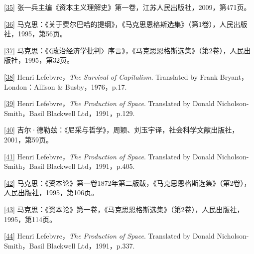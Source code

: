 \documentclass[UTF8, fontset = sourcesans, a4paper, oneside, zihao =
-4, scheme=chinese, no-math, space=true]{ctexbook}
\begin{document}
\protect\hypertarget{part0010_split_002.htmlux5cux23m35}{}{}\protect\hyperlink{part0010_split_002.htmlux5cux23w35}{{[}35{]}}
张一兵主编《资本主义理解史》第一卷，江苏人民出版社，2009，第471页。

\protect\hypertarget{part0010_split_002.htmlux5cux23m36}{}{}\protect\hyperlink{part0010_split_002.htmlux5cux23w36}{{[}36{]}}
马克思：《关于费尔巴哈的提纲》，《马克思恩格斯选集》（第1卷），人民出版社，1995，第56页。

\protect\hypertarget{part0010_split_002.htmlux5cux23m37}{}{}\protect\hyperlink{part0010_split_002.htmlux5cux23w37}{{[}37{]}}
马克思：《〈政治经济学批判〉序言》，《马克思恩格斯选集》（第2卷），人民出版社，1995，第32页。

\protect\hypertarget{part0010_split_002.htmlux5cux23m38}{}{}\protect\hyperlink{part0010_split_002.htmlux5cux23w38}{{[}38{]}}
Henri Lefebvre，\emph{The Survival of Capitalism}. Translated by Frank
Bryant，London：Allison \& Busby，1976，p.17.

\protect\hypertarget{part0010_split_002.htmlux5cux23m39}{}{}\protect\hyperlink{part0010_split_002.htmlux5cux23w39}{{[}39{]}}
Henri Lefebvre，\emph{The Production of Space}. Translated by Donald
Nicholson-Smith，Basil Blackwell Ltd，1991，p.129.

\protect\hypertarget{part0010_split_002.htmlux5cux23m40}{}{}\protect\hyperlink{part0010_split_002.htmlux5cux23w40}{{[}40{]}}
吉尔·德勒兹：《尼采与哲学》，周颖、刘玉宇译，社会科学文献出版社，2001，第59页。

\protect\hypertarget{part0010_split_002.htmlux5cux23m41}{}{}\protect\hyperlink{part0010_split_002.htmlux5cux23w41}{{[}41{]}}
Henri Lefebvre，\emph{The Production of Space}. Translated by Donald
Nicholson-Smith，Basil Blackwell Ltd，1991，p.405.

\protect\hypertarget{part0010_split_002.htmlux5cux23m42}{}{}\protect\hyperlink{part0010_split_002.htmlux5cux23w42}{{[}42{]}}
马克思：《资本论》第一卷1872年第二版跋，《马克思恩格斯选集》（第2卷），人民出版社，1995，第106页。

\protect\hypertarget{part0010_split_002.htmlux5cux23m43}{}{}\protect\hyperlink{part0010_split_002.htmlux5cux23w43}{{[}43{]}}
马克思：《资本论》第一卷，《马克思恩格斯选集》（第2卷），人民出版社，1995，第114页。

\protect\hypertarget{part0010_split_002.htmlux5cux23m44}{}{}\protect\hyperlink{part0010_split_002.htmlux5cux23w44}{{[}44{]}}
Henri Lefebvre，\emph{The Production of Space}. Translated by Donald
Nicholson-Smith，Basil Blackwell Ltd，1991，p.337.
\end{document}
